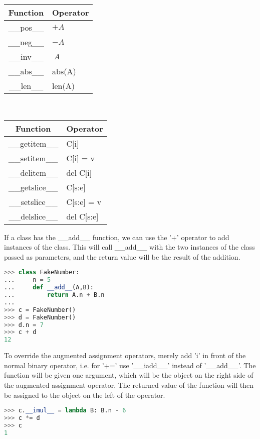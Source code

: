 \begin{tabular}{|c|p{2cm}|}
\hline
Function&Operator\\ \hline
\_\_pos\_\_ & $+A$\\ \hline
\_\_neg\_\_ & $-A$\\ \hline
\_\_inv\_\_ & $~A$\\ \hline
\_\_abs\_\_ & abs(A)\\ \hline
\_\_len\_\_ & len(A)\\ \hline
\end{tabular}\\

\begin{tabular}{|c|p{1.5cm}|} \hline
Function & Operator\\ \hline
\_\_getitem\_\_	 & C[i]\\ \hline
\_\_setitem\_\_	 & C[i] = v\\ \hline
\_\_delitem\_\_	 & del C[i]\\ \hline
\_\_getslice\_\_ & C[s:e]\\ \hline
\_\_setslice\_\_ & C[s:e] = v\\ \hline
\_\_delslice\_\_ & del C[s:e]\\ \hline
\end{tabular}

If a class has the \_\_add\_\_ function, we can use the '+' operator to add
instances of the class. This will call \_\_add\_\_ with the two instances of the
class passed as parameters, and the return value will be the result of the
addition.
\lstset{basicstyle=\scriptsize, numbers=left, captionpos=b, tabsize=4}
\begin{lstlisting}[caption=Add Operator,language={Python},
xleftmargin=15pt, label=lst:addoperator]
>>> class FakeNumber:
...     n = 5
...     def __add__(A,B):
...         return A.n + B.n
...
>>> c = FakeNumber()
>>> d = FakeNumber()
>>> d.n = 7
>>> c + d
12
\end{lstlisting}

To override the augmented assignment operators, merely add 'i' in front of the
normal binary operator, i.e. for '+=' use '\_\_iadd\_\_' instead of
'\_\_add\_\_'. The function will be given one argument, which will be the object
on the right side of the augmented assignment operator. The returned value of
the function will then be assigned to the object on the left of the operator.
\lstset{basicstyle=\scriptsize, numbers=left, captionpos=b, tabsize=4}
\begin{lstlisting}[caption=Mul Operator,language={Python},
xleftmargin=15pt, label=lst:muloperator]
>>> c.__imul__ = lambda B: B.n - 6
>>> c *= d
>>> c
1
\end{lstlisting}

